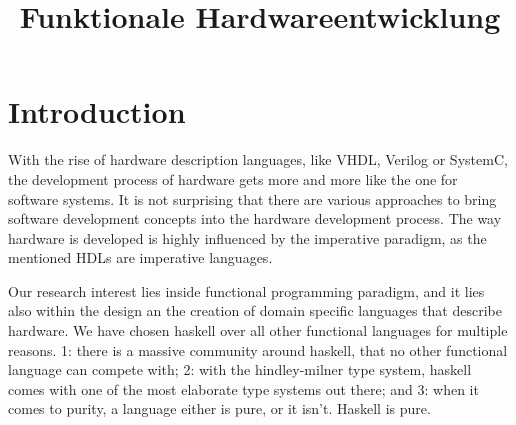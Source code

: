 \documentclass[journal]{book}
\begin{document}
\title{Funktionale Hardwareentwicklung}
\maketitle

 


\section{Introduction}

With the rise of hardware description languages, like VHDL, Verilog or SystemC, the development process of hardware gets more and
more like the one for software systems. It is not surprising that there are various approaches to bring software development
concepts into the hardware development process. The way hardware is developed is highly influenced by the imperative paradigm, as
the mentioned HDLs are imperative languages.

Our research interest lies inside functional programming paradigm, and it lies also within the design an the creation of domain
specific languages that describe hardware. We have chosen haskell over all other functional languages for multiple reasons. 1:
there is a massive community around haskell, that no other functional language can compete with; 2: with the hindley-milner type
system, haskell comes with one of the most elaborate type systems out there; and 3: when it comes to purity, a language either is 
pure, or it isn't. Haskell is pure.





\end{document}
